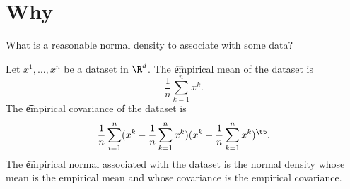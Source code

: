 
\section*{Why}

What is a reasonable normal density to associate with some data?


Let $x^1, \dots , x^n$ be a dataset in $\R ^d$.
The \t{empirical mean} of the dataset is
\[
\frac{1}{n} \sum_{k = 1}^{n} x^k.
\]
The \t{empirical covariance} of the dataset is
\[
\frac{1}{n} \sum_{i = 1}^{n} (x^k - \frac{1}{n} \sum_{k = 1}^{n} x^k) (x^k - \frac{1}{n} \sum_{k = 1}^{n} x^k)^{\tp}.
\]
The \t{empirical normal} associated with the dataset is the normal density whose mean is the empirical mean and whose covariance is the empirical covariance.
